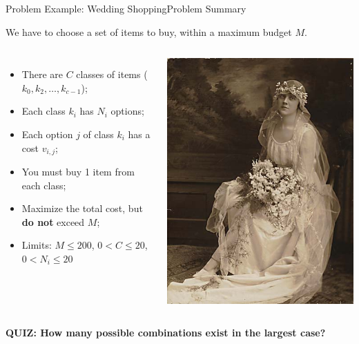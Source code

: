 \begin{frame}{Problem Example: Wedding Shopping}{Problem Summary}

  We have to choose a set of items to buy, within a maximum budget $M$.

    \begin{columns}
    \begin{itemize}
      \item There are $C$ classes of items ($k_0, k_2, \ldots, k_{c-1}$);
      \item Each class $k_i$ has $N_i$ options;
      \item Each option $j$ of class $k_i$ has a cost $v_{i,j}$;
      \bigskip

      \item You must buy 1 item from each class;
      \item Maximize the total cost, but {\bf do not} exceed $M$;
      \bigskip

      \item Limits: $M \leq 200$, $0 < C \leq 20$, $0 < N_i \leq 20$
    \end{itemize}

      \includegraphics[width=.8\textwidth]{../img/weddingdress}\\
    \end{columns}\bigskip

    {\bf QUIZ: How many possible combinations exist in the largest case?}

\end{frame}

